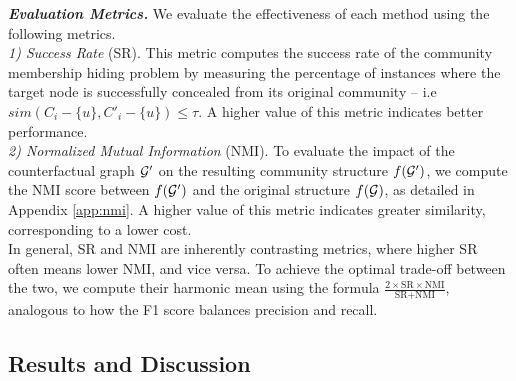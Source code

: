 \textbf{\textit{Evaluation Metrics.}}
We evaluate the effectiveness of each method 
using the following metrics.\\
\noindent \textit{1) Success Rate} (SR). This metric computes the success rate of the community membership hiding problem by measuring the percentage of instances where the target node is successfully concealed from its original community -- i.e $sim(C_i - \{u\}, C'_i - \{u\})  \leq \tau$. 
A higher value of this metric indicates better performance.\\
\noindent \textit{2) Normalized Mutual Information} (NMI). To evaluate the impact of the counterfactual graph $\mathcal{G}'$ on the resulting community structure $f(\mathcal{G}')$, we compute the NMI score 
between $f(\mathcal{G}')$ and the original structure $ f(\mathcal{G})$, 
as detailed in Appendix \ref{app:nmi}.
A higher value of this metric indicates greater similarity, corresponding to a lower cost. \\
In general, SR and NMI are inherently contrasting metrics, where higher SR often means lower NMI, and vice versa. To achieve the optimal trade-off between the two, we compute their harmonic mean using the formula $ \frac{2 \times \text{SR} \times \text{NMI}}{\text{SR} + \text{NMI}} $, analogous to how the F1 score balances precision and recall.



\subsection{Results and Discussion}
\label{subsec:results}



